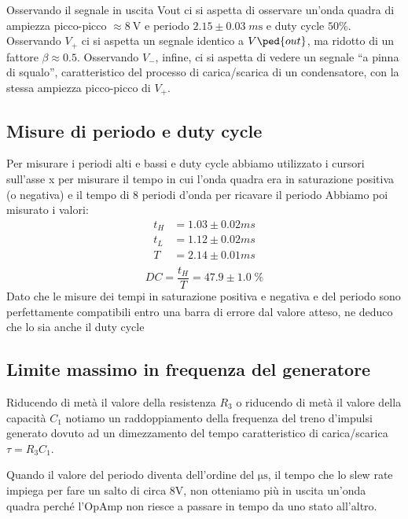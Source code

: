 \documentclass[10pt,a4paper]{article}
\begin{document}
Osservando il segnale in uscita Vout ci si aspetta di osservare un’onda quadra
di ampiezza picco-picco $\approx \SI{8}{\V}$ e periodo $2.15 \pm 0.03 \; \si{m\s}$ e
duty cycle $50 \%$.
Osservando $V_+$ ci si aspetta un segnale identico a $V\ped{out}$, ma ridotto di
un fattore $\beta \approx 0.5$.
Osservando $V_-$, infine, ci si aspetta di vedere un segnale ``a pinna di
squalo'', caratteristico del processo di carica/scarica di un condensatore,
con la stessa ampiezza picco-picco di $V_+$.

\subsection{Misure di periodo e duty cycle}
Per misurare i periodi alti e bassi e duty cycle abbiamo utilizzato i cursori sull'asse x per misurare il tempo in cui l'onda quadra era in saturazione positiva (o negativa) e il tempo di 8 periodi d'onda per ricavare il periodo
Abbiamo poi misurato i valori:
\begin{align}
t_H &=1.03 \pm 0.02 ms \\
t_L &=1.12 \pm 0.02 ms\\
T &=2.14 \pm 0.01 ms\\
\end{align}
\[
DC = \frac{t_H}{T}=47.9 \pm 1.0 \; \si{\%}
\]
Dato che le misure dei tempi in saturazione positiva e negativa e del periodo sono perfettamente compatibili entro una barra di errore dal valore atteso, ne deduco che lo sia anche il duty cycle

\subsection{Limite massimo in frequenza del generatore}
Riducendo di metà il valore della resistenza $R_3$ o riducendo di metà il
valore della capacità $C_1$ notiamo un raddoppiamento della frequenza
del treno d'impulsi generato dovuto ad un dimezzamento del tempo
caratteristico di carica/scarica $\tau=R_3 C_1$.

Quando il valore del periodo diventa dell'ordine del $\si{\micro\s}$, il
tempo che lo slew rate impiega per fare un salto di circa $8$V, non
otteniamo più in uscita un'onda quadra perché l'OpAmp non riesce a passare
in tempo da uno stato all'altro.

\end{document}
